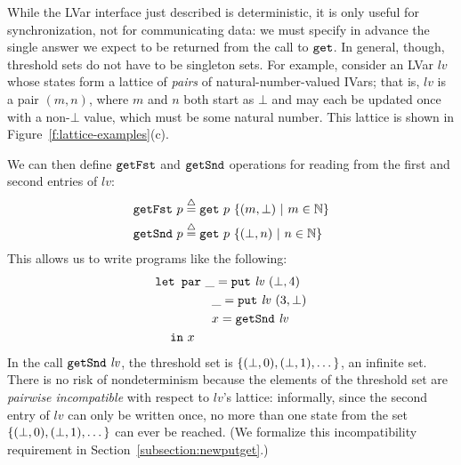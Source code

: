 While the LVar interface just described is deterministic, it is only useful for
synchronization, not for communicating data: we must specify in advance the
single answer we expect to be returned from the call to $\mbox{\texttt{get}}$.  In general,
though, threshold sets do not have to be singleton sets.  For example, consider
an LVar $\mathit{lv}$ whose states form a lattice of \emph{pairs} of
natural-number-valued IVars; that is, $\mathit{lv}$ is a pair $(m, n)$, where
$m$ and $n$ both start as $\bot$ and may each be updated once with a non-$\bot$
value, which must be some natural number.
This lattice is shown in Figure~\ref{f:lattice-examples}(c).

We can then define $\mbox{\texttt{getFst}}$ and
$\mbox{\texttt{getSnd}}$ operations for reading from the first and second entries of
$\mathit{lv}$:
\begin{align*}
\mbox{\texttt{getFst}}~p & \stackrel{\triangle}{=} \mbox{\texttt{get}}~p~\lbrace (m, \bot) \ | \  m \in
    \mathbb{N} \rbrace \\
\mbox{\texttt{getSnd}}~p & \stackrel{\triangle}{=} \mbox{\texttt{get}}~p~\lbrace (\bot, n) \ | \  n \in
    \mathbb{N} \rbrace
\end{align*}
This allows us to write programs like the following:
\begin{equation}
\begin{split}
& \mbox{\texttt{\mbox{\texttt{let}}~\mbox{\texttt{par}}}} ~\_ = \mbox{\texttt{put}}~\mathit{lv}~(\bot, 4) \\
&  \hspace{4.2em} ~\_ = \mbox{\texttt{put}}~\mathit{lv}~(3, \bot) \\
&  \hspace{4.2em} ~x = \mbox{\texttt{getSnd}}~\mathit{lv} \\
&  \hspace{1.2em} \mbox{\texttt{in}}~x
\end{split}
\label{e:lvar-example-4}
\end{equation}
In the call $\mbox{\texttt{getSnd}}~\mathit{lv}$, the threshold set is
 $\left\{(\bot, 0), (\bot, 1),  \dots\right\}$, an infinite set.  There
is no risk of nondeterminism because the elements of the threshold set
are \emph{pairwise incompatible} with respect to $\mathit{lv}$'s lattice:
informally, since the second entry of $\mathit{lv}$ can only be
written once, no more than one state from the set $\left\{(\bot, 0),
  (\bot, 1),  \dots\right\}$ can ever be reached.  (We formalize
this incompatibility requirement in
Section~\ref{subsection:newputget}.)  


